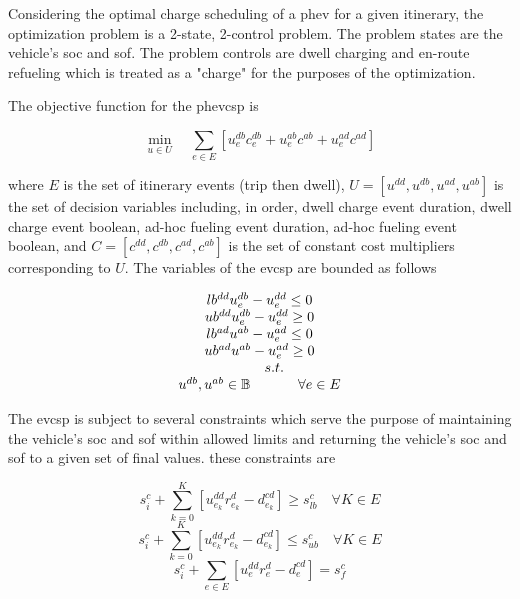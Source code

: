 \documentclass[12pt]{article}
\begin{document}
Considering the optimal charge scheduling of a \gls{phev} for a given itinerary, the optimization problem is a 2-state, 2-control problem. The problem states are the vehicle's \gls{soc} and \gls{sof}. The problem controls are dwell charging and en-route refueling which is treated as a "charge" for the purposes of the optimization.

The objective function for the \gls{phevcsp} is

\begin{equation}
	\min_{u\in U}\quad \sum_{e\in E}[u_e^{db}c_e^{db}+u_e^{ab}c^{ab}+u_e^{ad}c^{ad}] \label{eq:obj_phev}
\end{equation}

where $E$ is the set of itinerary events (trip then dwell), $U=[u^{dd},u^{db},u^{ad},u^{ab}]$ is the set of decision variables including, in order, dwell charge event duration, dwell charge event boolean, ad-hoc fueling event duration, ad-hoc fueling event boolean, and  $C=[c^{dd},c^{db},c^{ad},c^{ab}]$ is the set of constant cost multipliers corresponding to $U$. The variables of the \gls{evcsp} are bounded as follows

\begin{equation}
	\begin{array}{ccc}
		\multicolumn{3}{c}{lb^{dd}u_{e}^{db}-u_{e}^{dd}\leq 0}\\
		\multicolumn{3}{c}{ub^{dd}u_{e}^{db}-u_{e}^{dd}\geq 0}\\
		\multicolumn{3}{c}{lb^{ad}u^{ab}-u_{e}^{ad}\leq 0}\\
		\multicolumn{3}{c}{ub^{ad}u^{ab}-u_{e}^{ad}\geq 0}\\
		& s.t. & \\
		u^{db}, u^{ab}\in\mathbb{B} && \forall e\in E\\
	\end{array}
\end{equation}

The \gls{evcsp} is subject to several constraints which serve the purpose of maintaining the vehicle's \gls{soc} and \gls{sof} within allowed limits and returning the vehicle's \gls{soc} and \gls{sof} to a given set of final values. these constraints are

\begin{equation}
	s_i^c+\sum_{k=0}^{K}[u_{e_k}^{dd}r_{e_k}^{d}-d_{e_k}^{cd}]\geq s_{lb}^c\quad \forall K\in E
\end{equation}
\begin{equation}
	s_i^c+\sum_{k=0}^{K}[u_{e_k}^{dd}r_{e_k}^{d}-d_{e_k}^{cd}]\leq s_{ub}^c\quad \forall K\in E
\end{equation}
\begin{equation}
	s_i^c+\sum_{e\in E}[u_{e}^{dd}r_{e}^{d}-d_{e}^{cd}]=s_f^c
\end{equation}
\end{document}
